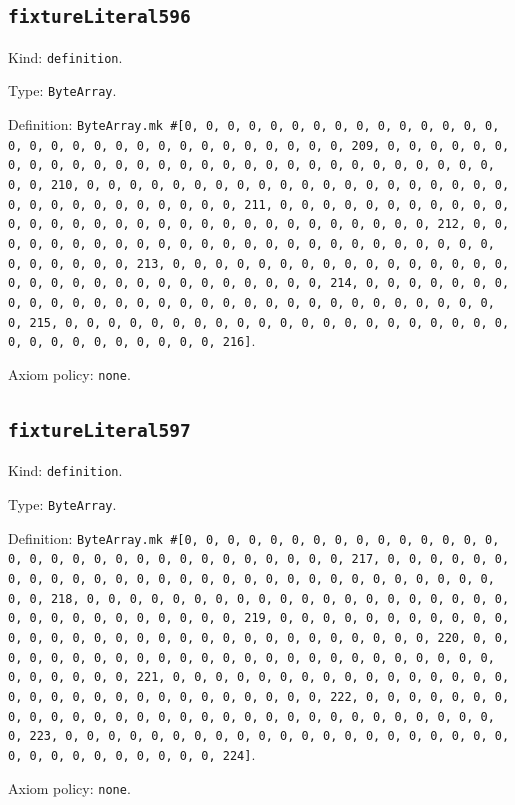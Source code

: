 \documentclass[11pt]{article}
\begin{document}
\subsection*{\texttt{fixtureLiteral596}}
\noindent Kind: \texttt{definition}.\par
\noindent Type: \texttt{ByteArray}.\par
\noindent Definition: \texttt{ByteArray.mk \#[0, 0, 0, 0, 0, 0, 0, 0, 0, 0, 0, 0, 0, 0, 0, 0, 0, 0, 0, 0, 0, 0, 0, 0, 0, 0, 0, 0, 0, 0, 0, 209, 0, 0, 0, 0, 0, 0, 0, 0, 0, 0, 0, 0, 0, 0, 0, 0, 0, 0, 0, 0, 0, 0, 0, 0, 0, 0, 0, 0, 0, 0, 0, 210, 0, 0, 0, 0, 0, 0, 0, 0, 0, 0, 0, 0, 0, 0, 0, 0, 0, 0, 0, 0, 0, 0, 0, 0, 0, 0, 0, 0, 0, 0, 0, 211, 0, 0, 0, 0, 0, 0, 0, 0, 0, 0, 0, 0, 0, 0, 0, 0, 0, 0, 0, 0, 0, 0, 0, 0, 0, 0, 0, 0, 0, 0, 0, 212, 0, 0, 0, 0, 0, 0, 0, 0, 0, 0, 0, 0, 0, 0, 0, 0, 0, 0, 0, 0, 0, 0, 0, 0, 0, 0, 0, 0, 0, 0, 0, 213, 0, 0, 0, 0, 0, 0, 0, 0, 0, 0, 0, 0, 0, 0, 0, 0, 0, 0, 0, 0, 0, 0, 0, 0, 0, 0, 0, 0, 0, 0, 0, 214, 0, 0, 0, 0, 0, 0, 0, 0, 0, 0, 0, 0, 0, 0, 0, 0, 0, 0, 0, 0, 0, 0, 0, 0, 0, 0, 0, 0, 0, 0, 0, 215, 0, 0, 0, 0, 0, 0, 0, 0, 0, 0, 0, 0, 0, 0, 0, 0, 0, 0, 0, 0, 0, 0, 0, 0, 0, 0, 0, 0, 0, 0, 0, 216]}.\par
\noindent Axiom policy: \texttt{none}.\par
\subsection*{\texttt{fixtureLiteral597}}
\noindent Kind: \texttt{definition}.\par
\noindent Type: \texttt{ByteArray}.\par
\noindent Definition: \texttt{ByteArray.mk \#[0, 0, 0, 0, 0, 0, 0, 0, 0, 0, 0, 0, 0, 0, 0, 0, 0, 0, 0, 0, 0, 0, 0, 0, 0, 0, 0, 0, 0, 0, 0, 217, 0, 0, 0, 0, 0, 0, 0, 0, 0, 0, 0, 0, 0, 0, 0, 0, 0, 0, 0, 0, 0, 0, 0, 0, 0, 0, 0, 0, 0, 0, 0, 218, 0, 0, 0, 0, 0, 0, 0, 0, 0, 0, 0, 0, 0, 0, 0, 0, 0, 0, 0, 0, 0, 0, 0, 0, 0, 0, 0, 0, 0, 0, 0, 219, 0, 0, 0, 0, 0, 0, 0, 0, 0, 0, 0, 0, 0, 0, 0, 0, 0, 0, 0, 0, 0, 0, 0, 0, 0, 0, 0, 0, 0, 0, 0, 220, 0, 0, 0, 0, 0, 0, 0, 0, 0, 0, 0, 0, 0, 0, 0, 0, 0, 0, 0, 0, 0, 0, 0, 0, 0, 0, 0, 0, 0, 0, 0, 221, 0, 0, 0, 0, 0, 0, 0, 0, 0, 0, 0, 0, 0, 0, 0, 0, 0, 0, 0, 0, 0, 0, 0, 0, 0, 0, 0, 0, 0, 0, 0, 222, 0, 0, 0, 0, 0, 0, 0, 0, 0, 0, 0, 0, 0, 0, 0, 0, 0, 0, 0, 0, 0, 0, 0, 0, 0, 0, 0, 0, 0, 0, 0, 223, 0, 0, 0, 0, 0, 0, 0, 0, 0, 0, 0, 0, 0, 0, 0, 0, 0, 0, 0, 0, 0, 0, 0, 0, 0, 0, 0, 0, 0, 0, 0, 224]}.\par
\noindent Axiom policy: \texttt{none}.\par
\end{document}
